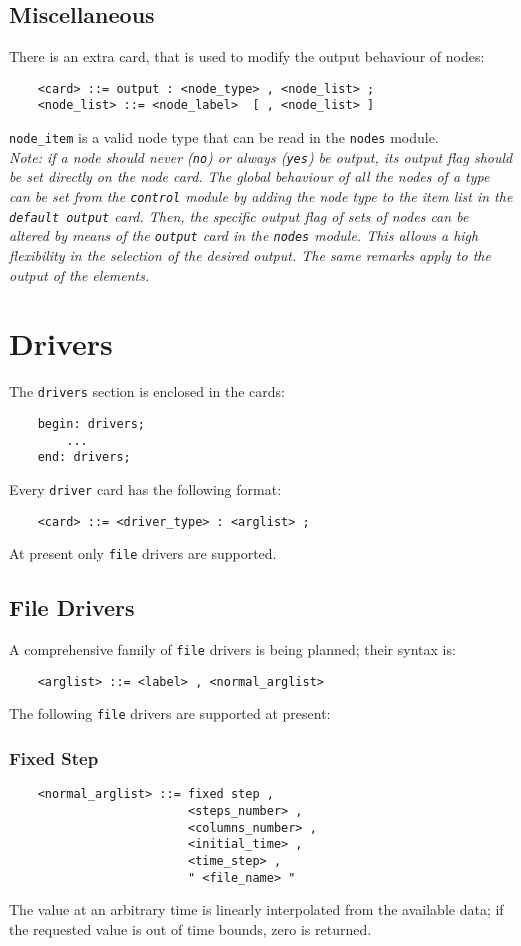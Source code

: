 \section{Miscellaneous}
There is an extra card, that is used to modify the output behaviour of nodes:  
\begin{verbatim}
    <card> ::= output : <node_type> , <node_list> ;
    <node_list> ::= <node_label>  [ , <node_list> ]
\end{verbatim}
\texttt{node\_item} is a valid node type that can be read in the \texttt{nodes}
module. \\
{\em
   Note: if a node should never (\texttt{no}) or always (\texttt{yes}) be output,
   its output flag should be set directly on the node card. 
   The global behaviour of all the nodes of a type can be set from the 
   \texttt{control} module by adding the node type to the item list in the 
   \texttt{default output} card. 
   Then, the specific output flag of sets of nodes can be altered by means 
   of the \texttt{output} card in the \texttt{nodes} module. 
   This allows a high flexibility in the selection of the desired output. 
   The same remarks apply to the output of the elements.
}






\chapter{Drivers}\label{sec:DRIVERS}
The \texttt{drivers} section is enclosed in the cards:
\begin{verbatim}
    begin: drivers;
        ...
    end: drivers;
\end{verbatim}
Every \texttt{driver} card has the following format:
\begin{verbatim}
    <card> ::= <driver_type> : <arglist> ;
\end{verbatim}
At present only \texttt{file} drivers are supported.

\section{File Drivers}
A comprehensive family of \texttt{file} drivers is being planned;
their syntax is:
\begin{verbatim}
    <arglist> ::= <label> , <normal_arglist>
\end{verbatim}
The following \texttt{file} drivers are supported at present:


\subsection{Fixed Step}
\begin{verbatim}
    <normal_arglist> ::= fixed step , 
                         <steps_number> ,
                         <columns_number> ,
                         <initial_time> ,
                         <time_step> ,
                         " <file_name> "
\end{verbatim}
The value at an arbitrary time is linearly interpolated from the available
data; if the requested value is out of time bounds, zero is returned.

